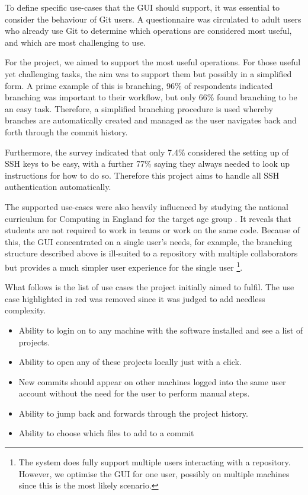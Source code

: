 To define specific use-cases that the GUI should support, it was essential to consider the behaviour of Git users. A questionnaire was circulated to adult users who already use Git to determine which operations are considered most useful, and which are most challenging to use. 

For the project, we aimed to support the most useful operations. For those useful yet challenging tasks, the aim was to support them but possibly in a simplified form. A prime example of this is branching, 96\% of respondents indicated branching was important to their workflow, but only 66\% found branching to be an easy task. Therefore, a simplified branching procedure is used whereby branches are automatically created and managed as the user navigates back and forth through the commit history.

Furthermore, the survey indicated that only 7.4\%  considered the setting up of SSH keys to be easy, with a further 77\% saying they always needed to look up instructions for how to do so. Therefore this project aims to handle all SSH authentication automatically.

The supported use-cases were also heavily influenced by studying the national curriculum for Computing in England for the target age group \cite{primarycoding}. It reveals that students are not required to work in teams or work on the same code. Because of this, the GUI concentrated on a single user's needs, for example, the branching structure described above is ill-suited to a repository with multiple collaborators but provides a much simpler user experience for the single user \footnote{The system does fully support multiple users interacting with a repository. However, we optimise the GUI for one user, possibly on multiple machines since this is the most likely scenario. }.

What follows is the list of use cases the project initially aimed to fulfil. The use case highlighted in red was removed since it was judged to add needless complexity.

\begin{itemize}
\item Ability to login on to any machine with the software installed and see a list of projects.
\item Ability to open any of these projects locally just with a click.
\item New commits should appear on other machines logged into the same user account without the need for the user to perform manual steps.
\item Ability to jump back and forwards through the project history.
\item \color{red}Ability to choose which files to add to a commit \color{black}
\end{itemize}

